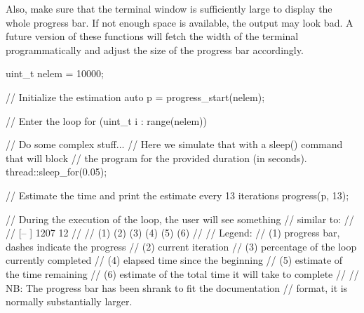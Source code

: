 Also, make sure that the terminal window is sufficiently large to display the whole progress bar. If not enough space is available, the output may look bad. A future version of these functions will
fetch the width of the terminal programmatically and adjust the size of the progress bar accordingly.

\begin{example}
\begin{cppcode}
uint_t nelem = 10000;

// Initialize the estimation
auto p = progress_start(nelem);

// Enter the loop
for (uint_t i : range(nelem)) {
    // Do some complex stuff...
    // Here we simulate that with a sleep() command that will block
    // the program for the provided duration (in seconds).
    thread::sleep_for(0.05);

    // Estimate the time and print the estimate every 13 iterations
    progress(p, 13);
}

// During the execution of the loop, the user will see something
// similar to:
//
// [--            ] 1207  12%
//
//        (1)        (2)  (3)      (4)           (5)          (6)
//
// Legend:
//  (1) progress bar, dashes indicate the progress
//  (2) current iteration
//  (3) percentage of the loop currently completed
//  (4) elapsed time since the beginning
//  (5) estimate of the time remaining
//  (6) estimate of the total time it will take to complete
//
// NB: The progress bar has been shrank to fit the documentation
// format, it is normally substantially larger.
\end{cppcode}
\end{example}
